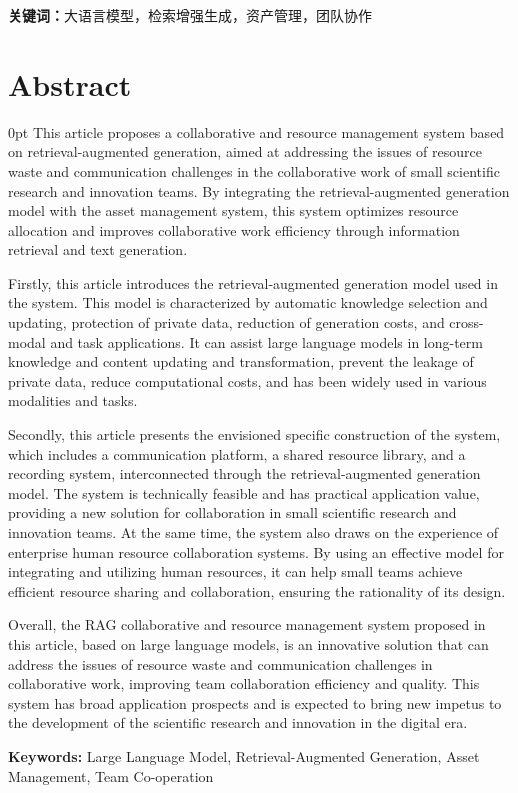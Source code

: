 \documentclass[zihao=-4]{ctexart}
\newcommand{\setParDis}{\setlength {\parskip} {0pt} }
\begin{document}
  \textbf{关键词：}大语言模型，检索增强生成，资产管理，团队协作

\newpage
\section*{\textbf{Abstract}}%
\begin{spacing}{1.5}
\begin{adjustwidth}{0.42cm}{0.42cm}
  \setParDis %
This article proposes a collaborative and resource management system based on retrieval-augmented generation, aimed at addressing the issues of resource waste and communication challenges in the collaborative work of small scientific research and innovation teams. By integrating the retrieval-augmented generation model with the asset management system, this system optimizes resource allocation and improves collaborative work efficiency through information retrieval and text generation.

Firstly, this article introduces the retrieval-augmented generation model used in the system. This model is characterized by automatic knowledge selection and updating, protection of private data, reduction of generation costs, and cross-modal and task applications. It can assist large language models in long-term knowledge and content updating and transformation, prevent the leakage of private data, reduce computational costs, and has been widely used in various modalities and tasks.

Secondly, this article presents the envisioned specific construction of the system, which includes a communication platform, a shared resource library, and a recording system, interconnected through the retrieval-augmented generation model. The system is technically feasible and has practical application value, providing a new solution for collaboration in small scientific research and innovation teams. At the same time, the system also draws on the experience of enterprise human resource collaboration systems. By using an effective model for integrating and utilizing human resources, it can help small teams achieve efficient resource sharing and collaboration, ensuring the rationality of its design.

Overall, the RAG collaborative and resource management system proposed in this article, based on large language models, is an innovative solution that can address the issues of resource waste and communication challenges in collaborative work, improving team collaboration efficiency and quality. This system has broad application prospects and is expected to bring new impetus to the development of the scientific research and innovation in the digital era.
\qquad 

\textbf{Keywords:} Large Language Model, Retrieval-Augmented Generation, Asset Management, Team Co-operation
\end{adjustwidth}
\end{spacing}
\end{document}
